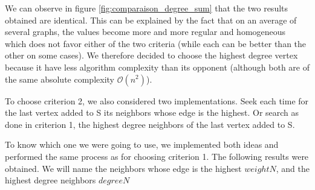 We can observe in figure \ref{fig:comparaison_degree_sum} that the two results obtained are identical. This can be explained by the fact that on an average of several graphs, the values become more and more regular and homogeneous which does not favor either of the two criteria (while each can be better than the other on some cases). We therefore decided to choose the highest degree vertex because it have less algorithm complexity than its opponent (although both are of the same absolute complexity $\mathcal{O}(n^2)$).
\bigskip

To choose criterion 2, we also considered two implementations. Seek each time for the last vertex added to S its neighbors whose edge is the highest. Or search as done in criterion 1, the highest degree neighbors of the last vertex added to S.
\bigskip

To know which one we were going to use, we implemented both ideas and performed the same process as for choosing criterion 1. The following results were obtained. We will name the neighbors whose edge is the highest $weightN$, and the highest degree neighbors $degreeN$
\bigskip

